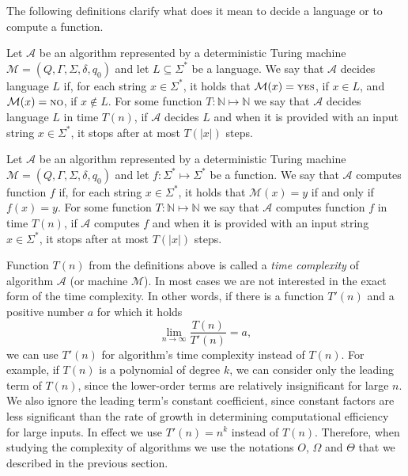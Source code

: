 The following definitions clarify what does it mean to decide a language or to compute a function.

\begin{definition} \label{def:decidability}
	Let $\mathcal{A}$ be an algorithm represented by a deterministic Turing machine $\mathcal{M}=(Q,\Gamma,\Sigma,\delta,q_0)$ and let $L\subseteq\Sigma^*$ be a language.
	We say that $\mathcal{A}$ decides language $L$ if, for each string $x\in\Sigma^*$, it holds that $\mathcal{M}(x)={\scriptstyle\rm YES}$, if $x\in L$, and $\mathcal{M}(x)={\scriptstyle\rm NO}$, if $x\not\in L$.
	For some function $T\colon\mathbb{N}\mapsto\mathbb{N}$ we say that $\mathcal{A}$ decides language $L$ in time $T(n)$, if $\mathcal{A}$ decides $L$ and when it is provided with an input string $x\in\Sigma^*$, it stops after at most $T(|x|)$ steps.
\end{definition}

\begin{definition} \label{def:computability}
	Let $\mathcal{A}$ be an algorithm represented by a deterministic Turing machine $\mathcal{M}=(Q,\Gamma,\Sigma,\delta,q_0)$ and let $f\colon\Sigma^*\mapsto\Sigma^*$ be a function.
	We say that $\mathcal{A}$ computes function $f$ if, for each string $x\in\Sigma^*$, it holds that $\mathcal{M}(x)=y$ if and only if $f(x)=y$.
	For some function $T\colon\mathbb{N}\mapsto\mathbb{N}$ we say that $\mathcal{A}$ computes function $f$ in time $T(n)$, if $\mathcal{A}$ computes $f$ and when it is provided with an input string $x\in\Sigma^*$, it stops after at most $T(|x|)$ steps.
\end{definition}

Function $T(n)$ from the definitions above is called a \emph{time complexity} of algorithm $\mathcal{A}$ (or machine $\mathcal{M}$).
In most cases we are not interested in the exact form of the time complexity.
In other words, if there is a function $T'(n)$ and a positive number $a$ for which it holds
\[
    \lim_{n\to\infty}\frac{T(n)}{T'(n)} = a,
\]
we can use $T'(n)$ for algorithm's time complexity instead of $T(n)$.
For example, if $T(n)$ is a polynomial of degree $k$, we can consider only the leading term of $T(n)$, since the lower-order terms are relatively insignificant for large $n$.
We also ignore the leading term's constant coefficient, since constant factors are less significant than the rate of growth in determining computational efficiency for large inputs.
In effect we use $T'(n)=n^k$ instead of $T(n)$.
Therefore, when studying the complexity of algorithms we use the notations $O$, $\Omega$ and $\Theta$ that we described in the previous section.

